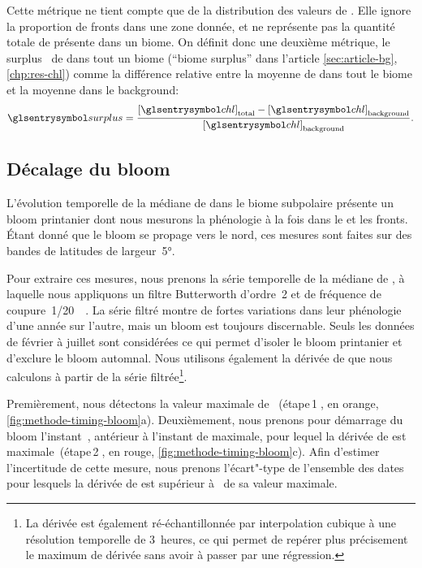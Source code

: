 Cette métrique ne tient compte que de la distribution des valeurs de . Elle ignore la proportion de fronts dans une zone donnée, et ne représente pas la quantité totale de  présente dans un biome.
On définit donc une deuxième métrique, le surplus~ de  dans tout un biome (\enquote{biome surplus} dans l'article \cref{sec:article-bg}, \cref*{chp:res-chl}) comme la différence relative entre la moyenne de  dans tout le biome et la moyenne dans le background:
\begin{equation}
  \am{surplus} = \frac{\moy{\am{chl}}_\tot - \moy{\am{chl}}_\bkg}
  {\moy{\am{chl}}_\bkg} .
\end{equation}

\subsection{Décalage du bloom}
\label{sec:decalage-bloom}

L'évolution temporelle de la médiane de  dans le biome subpolaire présente un bloom printanier dont nous mesurons la phénologie  à la fois dans le  et les fronts.
Étant donné que le bloom se propage vers le nord, ces mesures sont faites sur des bandes de latitudes de largeur~\ang{5}.

Pour extraire ces mesures, nous prenons la série temporelle de la médiane de , à laquelle nous appliquons un filtre Butterworth d'ordre~2 et de fréquence de coupure~\qty[parse-numbers=false]{1/20}{\per\jours}.
La série filtré montre de fortes variations dans leur phénologie d'une année sur l'autre, mais un bloom est toujours discernable.
Seuls les données de février à juillet sont considérées ce qui permet d'isoler le bloom printanier et d'exclure le bloom automnal.
Nous utilisons également la dérivée de  que nous calculons à partir de la série filtrée\footnote{%
  La dérivée est également ré-échantillonnée par interpolation cubique à une résolution temporelle de 3~heures, ce qui permet de repérer plus précisement le maximum de dérivée sans avoir à passer par une régression.
}.

Premièrement, nous détectons la valeur maximale de ~(étape\,\textcircled{1}, en orange, \cref{fig:methode-timing-bloom}a).
Deuxièmement, nous prenons pour démarrage du bloom l'instant~, antérieur à l'instant de  maximale, pour lequel la dérivée de  est maximale~(étape\,\textcircled{2}, en rouge, \cref{fig:methode-timing-bloom}c).
Afin d'estimer l'incertitude de cette mesure, nous prenons l'écart"-type de l'ensemble des dates pour lesquels la dérivée de  est supérieur à~ de sa valeur maximale.

